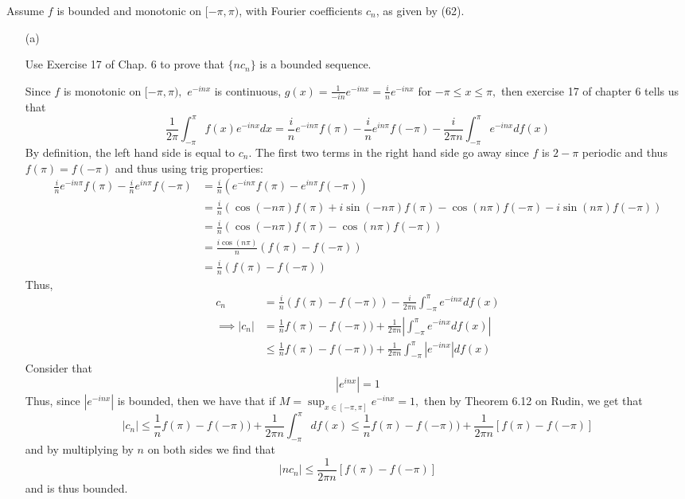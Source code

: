 \documentclass[11pt]{article}
\begin{document}
\newpage
\begin{problem}
    Assume $f$ is bounded and monotonic on $[-\pi, \pi)$, with Fourier coefficients $c_n$, as given by (62).

\begin{itemize}
    \item[(a)] 
    \begin{problem}
        
   Use Exercise 17 of Chap. 6 to prove that $\{n c_n\}$ is a bounded sequence.
    \end{problem}
    \begin{solution}
        Since $f$ is monotonic on $[-\pi, \pi),$ $e^{-inx}$ is continuous, $g(x) = \frac{1}{-in}e^{-inx} = \frac{i}{n}e^{-inx}$ for $-\pi\leq x\leq \pi,$ then exercise 17 of chapter 6 tells us that
        \[\frac{1}{2\pi}\int_{-\pi}^\pi f(x)e^{-inx}dx = \frac{i}{n}e^{-in\pi}f(\pi) - \frac{i}{n}e^{in\pi}f(-\pi) - \frac{i}{2\pi n}\int_{-\pi}^\pi e^{-inx}df(x)\] By definition, the left hand side is equal to $c_n.$ The first two terms in the right hand side go away since $f$ is $2-\pi$ periodic and thus $f(\pi) = f(-\pi)$ and thus using trig properties:
        \begin{align*}
            \frac{i}{n}e^{-in\pi}f(\pi) - \frac{i}{n}e^{in\pi}f(-\pi) &= \frac{i}{n}(e^{-in\pi}f(\pi) - e^{in\pi}f(-\pi))\\
            &= \frac{i}{n}(\cos(-n\pi)f(\pi) + i\sin(-n\pi)f(\pi) - \cos(n\pi)f(-\pi) - i\sin(n\pi)f(-\pi))\\
            &= \frac{i}{n}(\cos(-n\pi)f(\pi) - \cos(n\pi)f(-\pi))\\
            &= \frac{i\cos(n\pi)}{n}(f(\pi) - f(-\pi))\\
            &=\frac{i}{n}(f(\pi) - f(-\pi))
        \end{align*}
        Thus, 
        \begin{align*}
        c_n &= \frac{i}{n}(f(\pi) - f(-\pi))-\frac{i}{2\pi n}\int_{-\pi}^\pi e^{-inx} df(x)\\ \implies |c_n| &= \frac{1}{n}f(\pi) - f(-\pi)) + \frac{1}{2\pi n}\left|\int_{-\pi}^\pi e^{-inx}df(x)\right|\\
        &\leq \frac{1}{n}f(\pi) - f(-\pi)) + \frac{1}{2\pi n}\int_{-\pi}^\pi |e^{-inx}|df(x)
        \end{align*}
        Consider that 
        \[|e^{inx}| = 1\] Thus, since $|e^{-inx}|$ is bounded, then we have that if $M= \sup_{x\in [-\pi, \pi]} e^{-inx} = 1,$ then by Theorem 6.12 on Rudin, we get that
        \[|c_n| \leq \frac{1}{n}f(\pi) - f(-\pi)) + \frac{1}{2\pi n}\int_{-\pi}^\pi df(x) \leq \frac{1}{n}f(\pi) - f(-\pi)) + \frac{1}{2\pi n} [f(\pi) - f(-\pi)]\] and by multiplying by $n$ on both sides we find that 
        \[|nc_n|\leq \frac{1}{2\pi n}[f(\pi) - f(-\pi)]\] and is thus bounded.
        

\end{solution}
\end{itemize}
\end{problem}
\end{document}
